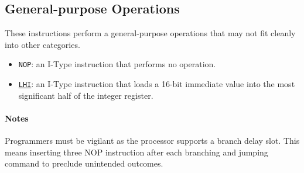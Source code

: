\subsection{General-purpose Operations}
These instructions perform a general-purpose operations that may not fit cleanly into other categories.

\begin{itemize}%
	\item \texttt{NOP}: an I-Type instruction that performs no operation.
	\item \underline{\texttt{LHI}}: an I-Type instruction that loads a 16-bit immediate value into the most significant half of the integer register.
\end{itemize}

\paragraph{Notes}

Programmers must be vigilant as the processor supports a branch delay slot. This means inserting three NOP instruction after each branching and jumping command to preclude unintended outcomes.


